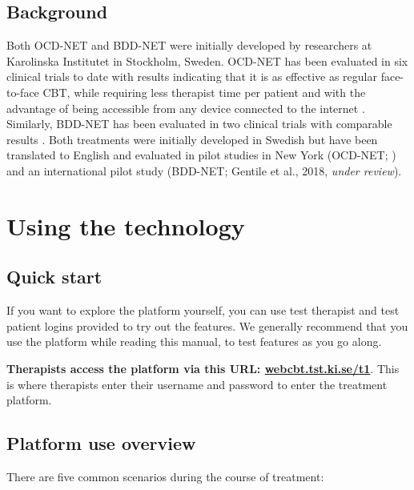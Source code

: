 \documentclass[]{book}
\theoremstyle{definition}
\theoremstyle{definition}
\theoremstyle{definition}
\theoremstyle{remark}
\begin{document}
\hypertarget{background}{%
\section{Background}\label{background}}

Both OCD-NET and BDD-NET were initially developed by researchers at
Karolinska Institutet in Stockholm, Sweden. OCD-NET has been evaluated
in six clinical trials to date with results indicating that it is as
effective as regular face-to-face CBT, while requiring less therapist
time per patient and with the advantage of being accessible from any
device connected to the internet
\citep{andersson2011a, andersson2012, andersson2014a, andersson2015a, ruck2018}.
Similarly, BDD-NET has been evaluated in two clinical trials with
comparable results \citep{enander2014, enander2016}. Both treatments
were initially developed in Swedish but have been translated to English
and evaluated in pilot studies in New York (OCD-NET; \citet{patel2017})
and an international pilot study (BDD-NET; Gentile et al., 2018,
\emph{under review}).

\hypertarget{using-the-technology}{%
\chapter{Using the technology}\label{using-the-technology}}

\hypertarget{quick-start}{%
\section{Quick start}\label{quick-start}}

If you want to explore the platform yourself, you can use test therapist
and test patient logins provided to try out the features. We generally
recommend that you use the platform while reading this manual, to test
features as you go along.

\textbf{Therapists access the platform via this URL:
\url{webcbt.tst.ki.se/t1}}. This is where therapists enter their
username and password to enter the treatment platform.

\hypertarget{platform-use-overview}{%
\section{Platform use overview}\label{platform-use-overview}}

There are five common scenarios during the course of treatment:
\end{document}
